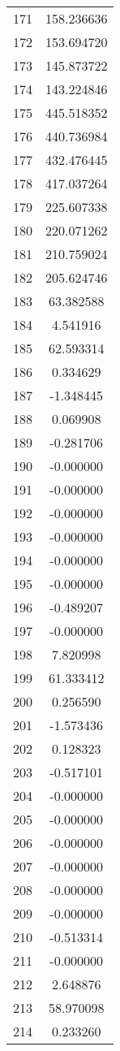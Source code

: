 \documentclass[12pt]{article}
\begin{document}
\begin{longtable}{@{}cc@{}}
171 & 158.236636 \\
172 & 153.694720 \\
173 & 145.873722 \\
174 & 143.224846 \\
175 & 445.518352 \\
176 & 440.736984 \\
177 & 432.476445 \\
178 & 417.037264 \\
179 & 225.607338 \\
180 & 220.071262 \\
181 & 210.759024 \\
182 & 205.624746 \\
183 & 63.382588 \\
184 & 4.541916 \\
185 & 62.593314 \\
186 & 0.334629 \\
187 & -1.348445 \\
188 & 0.069908 \\
189 & -0.281706 \\
190 & -0.000000 \\
191 & -0.000000 \\
192 & -0.000000 \\
193 & -0.000000 \\
194 & -0.000000 \\
195 & -0.000000 \\
196 & -0.489207 \\
197 & -0.000000 \\
198 & 7.820998 \\
199 & 61.333412 \\
200 & 0.256590 \\
201 & -1.573436 \\
202 & 0.128323 \\
203 & -0.517101 \\
204 & -0.000000 \\
205 & -0.000000 \\
206 & -0.000000 \\
207 & -0.000000 \\
208 & -0.000000 \\
209 & -0.000000 \\
210 & -0.513314 \\
211 & -0.000000 \\
212 & 2.648876 \\
213 & 58.970098 \\
214 & 0.233260 \\

\end{longtable}
\end{document}
